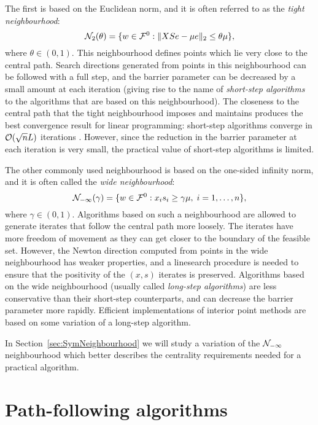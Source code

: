 The first is based on the Euclidean norm, and it is often referred
to as the {\em tight neighbourhood}:
\[
\mathcal{N}_2(\theta) = \{ w \in \mathcal{F}^0 :
                         \| XSe - \mu e \|_2 \le \theta\mu \},
\]
where $\theta \in (0,1)$.
This neighbourhood defines points which lie very close to the central path.
Search directions generated from points in this neighbourhood can be 
followed with a full step, and the barrier parameter can be decreased
by a small amount at each iteration (giving rise to the name
of {\em short-step algorithms} to the algorithms that are based on
this neighbourhood). 
The closeness to the central path that the tight neighbourhood
imposes and maintains produces the best convergence result
for linear programming: short-step algorithms converge in 
$\mathcal{O}(\sqrt{n}L)$ iterations \cite{KojimaMizunoYoshise89b,MonteiroAdler89a}.
However, since the reduction in the barrier parameter at each iteration 
is very small, the practical value of short-step algorithms is limited.

The other commonly used neighbourhood is based 
on the one-sided infinity norm, 
and it is often called the {\em wide neighbourhood}:
\[
\mathcal{N}_{-\infty}(\gamma) = \{ w \in \mathcal{F}^0 :
                         x_is_i \ge \gamma\mu, \; i = 1, \ldots, n \},
\]
where $\gamma \in (0,1).$
Algorithms based on such a neighbourhood are allowed to generate
iterates that follow the central path more loosely. The iterates 
have more freedom of movement as they can get closer to the boundary
of the feasible set.
However, the Newton direction computed from points in the wide 
neighbourhood  has weaker properties, and a linesearch procedure is
needed to ensure that the positivity of the $(x,s)$ iterates is
preserved.
Algorithms based on the wide neighbourhood (usually called
{\em long-step algorithms}) are less conservative than their short-step
counterparts, and can decrease 
the barrier parameter more rapidly.
Efficient implementations of interior point methods are based
on some variation of a long-step algorithm.

In Section~\ref{sec:SymNeighbourhood} we will study a variation
of the $\mathcal{N}_{-\infty}$ neighbourhood which better describes
the centrality requirements needed for a practical algorithm.



%
%
\section{Path-following algorithms}
\label{sec:PathFollowingAlgorithms}

